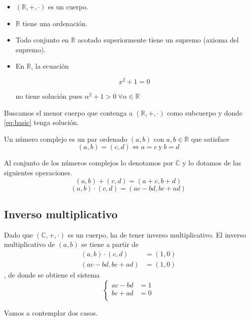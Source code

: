 \documentclass{apuntes}
\begin{document}
\begin{itemize}
\item $(\mathbb{R}, +, \cdot)$ es un cuerpo.
\item $\mathbb{R}$ tiene una ordenación.
\item Todo conjunto en $\mathbb{R}$ acotado superiormente tiene un supremo (axioma del supremo).
\item En $\mathbb{R}$, la ecuación

\begin{equation} \label{eq:basic}
x^2+1=0
\end{equation}

no tiene solución pues $\alpha^2+1>0 \ \forall \alpha \in \mathbb{R}$
\end{itemize}
Buscamos el menor cuerpo que contenga a $(\mathbb{R}, +, \cdot)$ como subcuerpo y donde \eqref{eq:basic} tenga solución.

\begin{defn}
Un número complejo es un par ordenado $(a,b)$ con $a,b\in\mathbb{R}$ que satisface
\[(a,b)=(c,d) \iff a=c\ \text{y} \ b=d\]

Al conjunto de los números complejos lo denotamos por $\mathbb{C}$ y lo dotamos de las siguientes operaciones.
\[(a,b)+(c,d) = (a+c, b+d)\]
\[(a,b)\cdot(c,d) = (ac-bd, bc+ad)\]
\end{defn}

\subsection{Inverso multiplicativo}

Dado que $(\mathbb{C}, +, \cdot)$ es un cuerpo, ha de tener inverso multiplicativo. El inverso multiplicativo de $(a,b)$ se tiene a partir de
\begin{align*}
    (a,b)\cdot(c,d) & = (1,0)\\
    (ac-bd, bc+ad) & = (1,0)
\end{align*}, de donde se obtiene el sistema
\[
\left\{
\begin{array}{cc}
    ac-bd & = 1\\
    bc+ad & = 0\\
\end{array}
\right.
\]

Vamos a contemplar dos casos.
\end{document}

